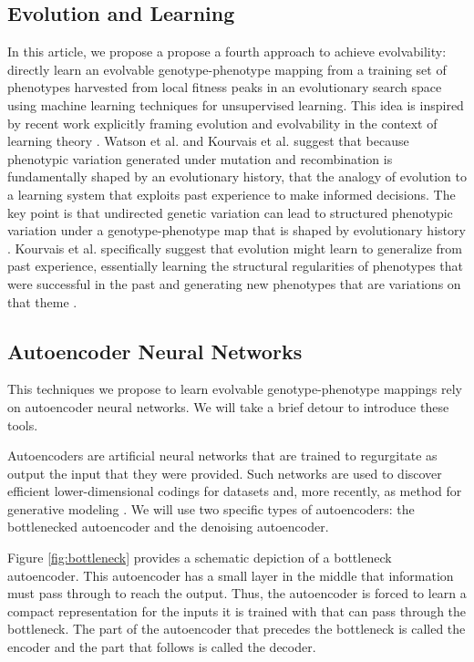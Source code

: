 \subsection{Evolution and Learning}

In this article, we propose a propose a fourth approach to achieve evolvability: directly learn an evolvable genotype-phenotype mapping from a training set of phenotypes harvested from local fitness peaks in an evolutionary search space using machine learning techniques for unsupervised learning.
This idea is inspired by recent work explicitly framing evolution and evolvability in the context of learning theory \cite{kouvaris2017evolution, watson2016can}.
Watson et al. and Kourvais et al. suggest that because phenotypic variation generated under mutation and recombination is fundamentally shaped by an evolutionary history, that the analogy of evolution to a learning system that exploits past experience to make informed decisions.
The key point is that undirected genetic variation can lead to structured phenotypic variation under a genotype-phenotype map that is shaped by evolutionary history \cite{watson2016can}.
Kourvais et al. specifically suggest that evolution might learn to generalize from past experience, essentially learning the structural regularities of phenotypes that were successful in the past and generating new phenotypes that are variations on that theme \cite{kouvaris2017evolution}.

\subsection{Autoencoder Neural Networks}

This techniques we propose to learn evolvable genotype-phenotype mappings rely on autoencoder neural networks.
We will take a brief detour to introduce these tools.

Autoencoders are artificial neural networks that are trained to regurgitate as output the input that they were provided.
Such networks are used to discover efficient lower-dimensional codings for datasets and, more recently, as method for generative modeling \cite{liou2014autoencoder, kingma2013auto}.
We will use two specific types of autoencoders: the bottlenecked autoencoder and the denoising autoencoder.



Figure \ref{fig:bottleneck} provides a schematic depiction of a bottleneck autoencoder.
This autoencoder has a small layer in the middle that information must pass through to reach the output.
Thus, the autoencoder is forced to learn a compact representation for the inputs it is trained with that can pass through the bottleneck.
The part of the autoencoder that precedes the bottleneck is called the encoder and the part that follows is called the decoder.

